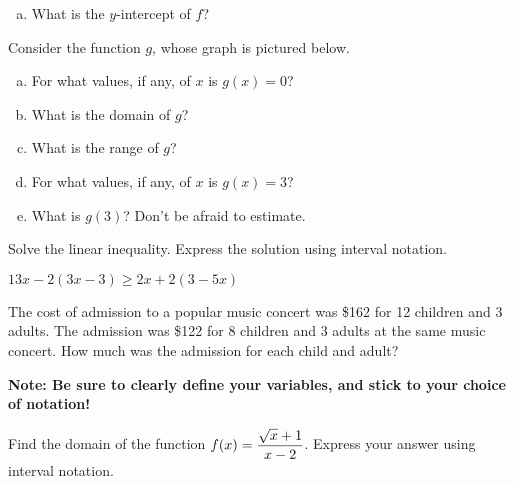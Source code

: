 \documentclass[11pt]{exam}
\begin{document}
\begin{questions}
\begin{enumerate}[(a)]
\item What is the $y$-intercept of $f$?
\vfill
\end{enumerate}
\newpage

\question[5] Consider the function $g$, whose graph is pictured below.
\begin{center}
\end{center}
\begin{enumerate}[(a)]
\item For what values, if any, of $x$ is $g(x) = 0$?
\vfill

\item What is the domain of $g$?
\vfill

\item What is the range of $g$?
\vfill

\item For what values, if any, of $x$ is $g(x) = 3$?
\vfill

\item What is $g(3)$?  Don't be afraid to estimate.
\vfill

\end{enumerate}
\newpage

\question[3] Solve the linear inequality.  Express the solution using interval notation.
\begin{center}
$13x - 2(3x - 3)\geq 2x + 2(3 - 5x)$
\end{center}
\newpage

\question[4] The cost of admission to a popular music concert was \$162 for 12 children and 3 \nolinebreak adults.
The admission was \$122 for 8 children and 3 adults at the same music concert. How much was the admission for each child and adult?
 
\noindent\textbf{Note:  Be sure to clearly define your variables, and stick to your choice of notation!}
\vspace{10cm}

\question[3] Find the domain of the function $\displaystyle{f(x) = \frac{\sqrt{x} + 1}{x - 2}}$.  Express your answer using interval notation.

\end{questions}
\end{document}
